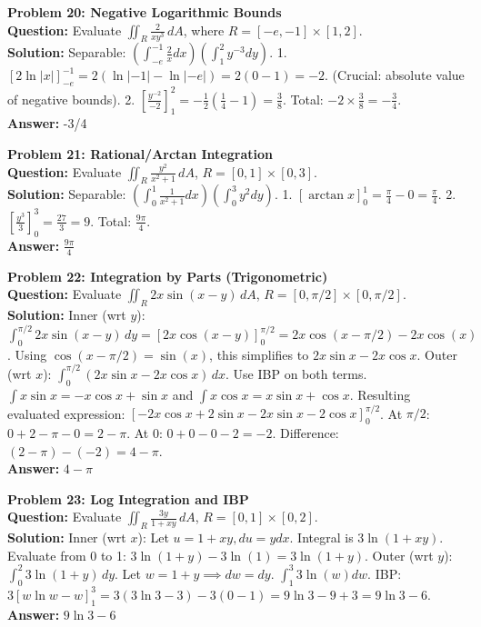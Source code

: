 \documentclass[11pt]{article}
\begin{document}
\vspace{0.5cm}
\noindent\textbf{Problem 20: Negative Logarithmic Bounds} \\
\textbf{Question:} Evaluate $\iint_R \frac{2}{xy^3} \, dA$, where $R = [-e,-1] \times [1,2]$. \\
\textbf{Solution:} Separable: $\left(\int_{-e}^{-1} \frac{2}{x} dx\right)\left(\int_1^2 y^{-3} dy\right)$.
1. $\left[2\ln|x|\right]_{-e}^{-1} = 2(\ln|-1| - \ln|-e|) = 2(0 - 1) = -2$. (Crucial: absolute value of negative bounds).
2. $\left[\frac{y^{-2}}{-2}\right]_1^2 = -\frac{1}{2}(\frac{1}{4} - 1) = \frac{3}{8}$.
Total: $-2 \times \frac{3}{8} = -\frac{3}{4}$. \\
\textbf{Answer:} -3/4

\vspace{0.5cm}
\noindent\textbf{Problem 21: Rational/Arctan Integration} \\
\textbf{Question:} Evaluate $\iint_R \frac{y^2}{x^2+1} \, dA$, $R = [0,1] \times [0,3]$. \\
\textbf{Solution:} Separable: $\left(\int_0^1 \frac{1}{x^2+1} dx\right)\left(\int_0^3 y^2 dy\right)$.
1. $\left[\arctan x\right]_0^1 = \frac{\pi}{4} - 0 = \frac{\pi}{4}$.
2. $\left[\frac{y^3}{3}\right]_0^3 = \frac{27}{3} = 9$.
Total: $\frac{9\pi}{4}$. \\
\textbf{Answer:} $\frac{9\pi}{4}$

\vspace{0.5cm}
\noindent\textbf{Problem 22: Integration by Parts (Trigonometric)} \\
\textbf{Question:} Evaluate $\iint_R 2x \sin(x-y) \, dA$, $R = [0,\pi/2] \times [0,\pi/2]$. \\
\textbf{Solution:} Inner (wrt $y$): $\int_0^{\pi/2} 2x \sin(x-y) \, dy = \left[ 2x \cos(x-y) \right]_0^{\pi/2} = 2x \cos(x-\pi/2) - 2x \cos(x)$.
Using $\cos(x-\pi/2) = \sin(x)$, this simplifies to $2x \sin x - 2x \cos x$.
Outer (wrt $x$): $\int_0^{\pi/2} (2x \sin x - 2x \cos x) \, dx$.
Use IBP on both terms. $\int x \sin x = -x \cos x + \sin x$ and $\int x \cos x = x \sin x + \cos x$.
Resulting evaluated expression: $\left[ -2x\cos x + 2\sin x - 2x\sin x - 2\cos x \right]_0^{\pi/2}$.
At $\pi/2$: $0 + 2 - \pi - 0 = 2 - \pi$.
At $0$: $0 + 0 - 0 - 2 = -2$.
Difference: $(2-\pi) - (-2) = 4 - \pi$. \\
\textbf{Answer:} $4 - \pi$

\vspace{0.5cm}
\noindent\textbf{Problem 23: Log Integration and IBP} \\
\textbf{Question:} Evaluate $\iint_R \frac{3y}{1+xy} \, dA$, $R = [0,1] \times [0,2]$. \\
\textbf{Solution:} Inner (wrt $x$): Let $u = 1+xy, du = y dx$. Integral is $3\ln(1+xy)$.
Evaluate from 0 to 1: $3\ln(1+y) - 3\ln(1) = 3\ln(1+y)$.
Outer (wrt $y$): $\int_0^2 3\ln(1+y) \, dy$. Let $w = 1+y \implies dw = dy$. $\int_1^3 3\ln(w) dw$.
IBP: $3[w \ln w - w]_1^3 = 3(3\ln 3 - 3) - 3(0 - 1) = 9\ln 3 - 9 + 3 = 9\ln 3 - 6$. \\
\textbf{Answer:} $9\ln 3 - 6$
\end{document}
